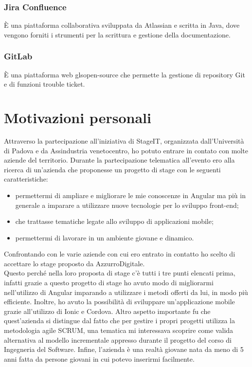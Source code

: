 \subsubsection{Jira Confluence}
È una piattaforma collaborativa sviluppata da Atlassian e scritta in Java, dove vengono forniti i strumenti per la scrittura e gestione della documentazione.

\subsubsection{GitLab}
È una piattaforma web gls{open-source}\ap{[g]} che permette la gestione di repository Git e di funzioni trouble ticket.

\section{Motivazioni personali}
Attraverso la partecipazione all'iniziativa di StageIT, organizzata dall'Università di Padova e da Assindustria venetocentro, ho potuto entrare in contato con molte aziende del territorio.
Durante la partecipazione telematica all'evento ero alla ricerca di un’azienda che proponesse un progetto di stage con le seguenti caratteristiche:

\begin{itemize}
	\item permettermi di ampliare e migliorare le mie conoscenze in Angular ma più in generale a imparare a utilizzare nuove tecnologie per lo sviluppo front-end;
	\item che trattasse tematiche legate allo sviluppo di applicazioni mobile;
	\item permettermi di lavorare in un ambiente giovane e dinamico.
	
\end{itemize}  

Confrontando con le varie aziende con cui ero entrato in contatto ho scelto di accettare lo stage proposto da AzzurroDigitale. \\
Questo perché nella loro proposta di stage c'è tutti i tre punti elencati prima, infatti grazie a questo progetto di stage ho avuto modo di migliorarmi nell’utilizzo di Angular imparando a utilizzare i metodi offerti da lui, in modo più efficiente. Inoltre, ho avuto la possibilità di sviluppare un’applicazione mobile grazie all'utilizzo di Ionic e Cordova. Altro aspetto importante fu che quest'azienda si distingue dal fatto che per gestire i propri progetti utilizza la metodologia agile \gls{SCRUM}, una tematica mi interessava scoprire come valida alternativa al modello incrementale appresso durante il progetto del corso di Ingegneria del Software. Infine, l'azienda è una realtà giovane nata da meno di 5 anni fatta da persone giovani in cui potevo inserirmi facilmente.\\
